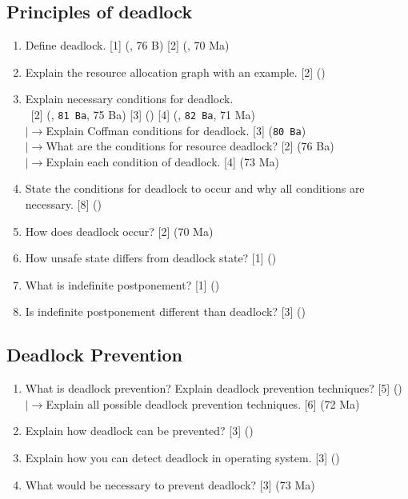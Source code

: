 \documentclass[12pt]{article}
\newcommand{\lb}{\\$\left|\rightarrow\right.$}
\newcommand{\enter}{\\\textcolor{white}{1}}
\begin{document}
	\subsection{Principles of deadlock}
		\begin{enumerate}[noitemsep, topsep=0pt]
			\item Define deadlock. \hfill [1] (, 76 B) [2] (, 70 Ma)
			
			\item Explain the resource allocation graph with an example. \hfill [2] ()

			\item Explain necessary conditions for deadlock.
			\enter\hfill [2] (, \texttt{81 Ba}, 75 Ba) [3] () [4] (, \texttt{82 Ba}, 71 Ma)
			\lb Explain Coffman conditions for deadlock. \hfill [3] (\texttt{80 Ba})
			\lb What are the conditions for resource deadlock? \hfill [2] (76 Ba)
			\lb Explain each condition of deadlock. \hfill [4] (73 Ma)

			\item State the conditions for deadlock to occur and why all conditions are necessary. \hfill [8] ()

			\item How does deadlock occur? \hfill [2] (70 Ma)

			\item How unsafe state differs from deadlock state? \hfill [1] ()

			\item What is indefinite postponement? \hfill [1] ()
			
			\item Is indefinite postponement different than deadlock? \hfill [3] ()
			
		\end{enumerate}

	\subsection{Deadlock Prevention}
		\begin{enumerate}[noitemsep, topsep=0pt]
			\item What is deadlock prevention? Explain deadlock prevention techniques? \hfill [5] ()
			\lb Explain all possible deadlock prevention techniques. \hfill [6] (72 Ma)

			\item Explain how deadlock can be prevented? \hfill [3] ()

			\item Explain how you can detect deadlock in operating system. \hfill [3] ()

			\item  What would be necessary to prevent deadlock? \hfill [3] (73 Ma) 
		\end{enumerate}
\end{document}
